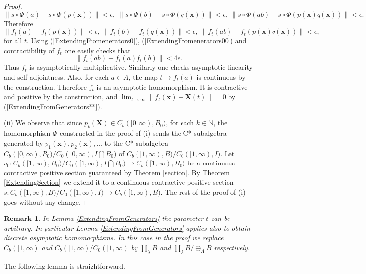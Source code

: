 \documentclass{article}%
\newtheorem{remark}[theorem]{Remark}
\begin{document}
\begin{proof}
$$\|s\circ \Phi(a) - s\circ \Phi(p(\mathbf x))\|<\epsilon, \; \|s\circ \Phi(b) - s\circ \Phi(q(\mathbf x))\|<\epsilon, \;
\|s\circ \Phi(ab) - s\circ \Phi(p(\mathbf x)q(\mathbf x))\|<\epsilon.$$ Therefore
\begin{equation}\label{ExtendingFromenerators00}\|f_t(a) - f_t(p(\mathbf x))\|< \epsilon, \;\|f_t(b) - f_t(q(\mathbf x))\|< \epsilon, \;\|f_t(ab) - f_t(p(\mathbf x)q(\mathbf x))\|< \epsilon,\end{equation}
for all $t$.
Using (\ref{ExtendingFromenerators0}), (\ref{ExtendingFromenerators00}) and contractibility of $f_t$ one easily checks that
$$\|f_t(ab) - f_t(a)f_t(b)\|< 4 \epsilon.$$ Thus $f_t$ is asymptotically multiplicative. Similarly one checks asymptotic linearity and self-adjointness. Also, for each $a\in A$, the map $t\mapsto f_t(a)$ is continuous by the construction.  Therefore  $f_t$ is an asymptotic homomorphism. It is contractive and positive by the construction, and $\lim_{t\to \infty} \|f_t(\mathbf x) - \mathbf X(t)\| = 0$  by (\ref{ExtendingFromGenerators**}).

\medskip

(ii)  We observe that since $p_k(\mathbf X)\in C_b([0, \infty), B_0)$, for each $k\in \mathbb N$,  the homomorphism $\Phi$ constructed in the proof of (i) sends the C*-subalgebra generated by $p_1(\mathbf x), p_2(\mathbf x), \ldots$ to the C*-subalgebra $C_b([0, \infty), B_0)/C_0([0, \infty), I\bigcap B_0) $ of $C_b([1, \infty), B)/C_0([1, \infty), I) $.  Let $s_0: C_b([1, \infty), B_0)/C_0([1, \infty), I\bigcap B_0) \to C_b([1, \infty), B_0)$ be a continuous contractive positive section guaranteed by Theorem \ref{section}. By Theorem \ref{ExtendingSection} we extend it to a continuous contractive positive section $s: C_b([1, \infty), B)/C_0([1, \infty), I) \to C_b([1, \infty), B)$. The rest of the proof of (i) goes without any change.
\end{proof}


\begin{remark}\label{DiscreteVersionOfLemma} In Lemma \ref{ExtendingFromGenerators} the parameter $t$ can be arbitrary. In particular Lemma \ref{ExtendingFromGenerators} applies also to obtain discrete asymptotic homomorphisms. In this case in the proof we replace $C_b([1, \infty)$ and $C_b([1, \infty)/C_0([1, \infty) $ by $\prod_{\lambda}B$ and $\prod_{\lambda}B /\oplus_{\Lambda} B$ respectively. \end{remark}

The following lemma is straightforward.
\end{document}
